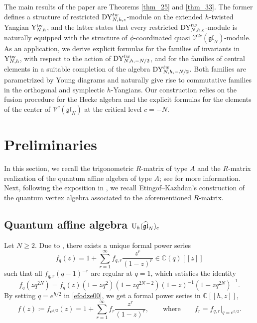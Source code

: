 \documentclass[12pt,a4paper,reqno]{amsart}
\theoremstyle{stil}
\theoremstyle{defi}
\theoremstyle{defi}
\theoremstyle{stil}
\theoremstyle{stil}
\theoremstyle{stil}
\theoremstyle{prim}
\newcommand{\beq}{\begin{equation}}
\newcommand{\eeq}{\end{equation}}
\newcommand{\uh}{{\rm U}_h (\widehat{\mathfrak{gl}}_N)_c}
\newcommand{\CC}{\mathbb{C}}
\newcommand{\Vc}{\mathcal{V}^{2c}(\mathfrak{gl}_N)}
\newcommand{\Vcdva}{\mathcal{V}^{c}(\mathfrak{gl}_N)}
\begin{document}
The main results of the paper are Theorems \ref{thm_25} and \ref{thm_33}. The former defines a structure of restricted ${\rm DY}_{N,h,c}^{tw}$-module on the
extended $h$-twisted Yangian ${\rm Y}_{N,h}^{\text{tw}}$, and the latter states that every restricted ${\rm DY}_{N,h,c}^{tw}$-module is naturally  equipped with the structure of 
$\phi$-coordinated quasi $\Vc$-module.
As an application, we derive explicit formulas for the families of invariants in ${\rm Y}_{N,h}^{\text{tw}}$, with respect to the action of ${\rm DY}_{N,h,-N/2}^{tw}$, and for the families of central elements in a suitable completion of the  algebra ${\rm DY}_{N,h,-N/2}^{tw}$. Both families are   parametrized by Young diagrams and   naturally give  rise to commutative families in the  orthogonal and  symplectic $h$-Yangians.
Our construction relies on 
the fusion procedure for the Hecke algebra \cite{C,IMO,N}    and
 the explicit formulas \cite{BJK,KM} for the elements of the   center of $\Vcdva$ at the critical level $c=-N$.




\section{Preliminaries}\label{section_01}

 
In this section, we recall the trigonometric $R$-matrix of   type $A$  and the $R$-matrix realization of the quantum affine algebra  of   type $A$;  see     \cite{FRT,J,PS,RS} for more information. Next, following the exposition in \cite[Sect. 4]{BJK}, we recall   Etingof--Kazhdan's construction \cite[Thm. 2.3]{EK} of the quantum   vertex algebra associated to the aforementioned $R$-matrix. 

\subsection{Quantum affine algebra \texorpdfstring{$\uh$}{Uh(glN)c}}\label{section_0101}
Let $N\geqslant 2$.
Due to  \cite{FR}, there exists a unique formal  power series  
\beq\label{efodze00}
f_q(z)=1+\sum_{r=1}^\infty f_{q,r} \frac{z^r}{(1-z)^{r}} \in \CC(q)[[z]] 
\eeq  
  such that all $f_{q,r}(q-1)^{-r}$ are regular at $q=1$, which satisfies the identity
$$
f_q(zq^{2N})=f_q(z) (1-zq^2)(1-zq^{2N-2}) (1-z)^{-1}(1-zq^{2N})^{-1}.
$$
By setting $q=e^{h/2} $ in \eqref{efodze00}, we get a   formal power series in $ \CC[[h,z]],$
$$
f(z)\coloneqq f_{e^{h/2}}(z)=1+\sum_{r=1}^\infty f_{r} \frac{z^r}{(1-z)^{r}} ,\qquad\text{where}\qquad
f_r=f_{q,r}\big|_{q=e^{h/2}}.
$$
\end{document}
